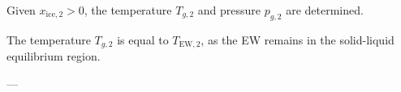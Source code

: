 Given \( x_{\text{ice},2} > 0 \), the temperature \( T_{g,2} \) and pressure \( p_{g,2} \) are determined.  

The temperature \( T_{g,2} \) is equal to \( T_{\text{EW},2} \), as the EW remains in the solid-liquid equilibrium region.  

---